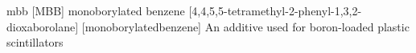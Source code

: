 \newglsXchemical%
{mbb}%
[MBB]%
{monoborylated benzene}%
[4,4,5,5-tetramethyl-2-phenyl-1,3,2-dioxaborolane]%
{}%
[monoborylatedbenzene]%
{An additive used for boron{\--}loaded plastic scintillators}%